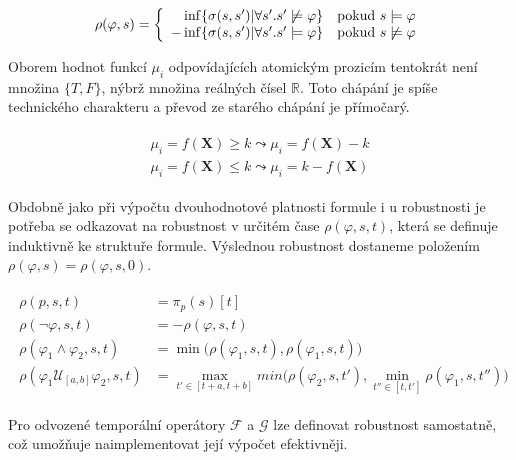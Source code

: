 \begin{align}\label{eq:signal:distance}
\rho(\varphi, s) = \left\{\begin{array}{r@{\quad}c}
\inf\{\sigma(s, s') | \forall s'. s' \not\models \varphi \}	& \textrm{pokud } s \models \varphi	\\
- \inf\{\sigma(s, s') | \forall s'. s' \models \varphi \}	& \textrm{pokud } s \not\models \varphi
\end{array} \right.
\end{align}

Oborem hodnot funkcí $\mu_i$ odpovídajících atomickým prozicím tentokrát není množina $\{T, F\}$,
nýbrž množina reálných čísel $\mathbb{R}$. Toto chápání je spíše technického charakteru a převod
ze starého chápání je přímočarý.

\begin{align}\label{eq:stl:semantics}
\begin{array}{ll}
\mu_i = f(\mathbf{X}) \geq k		\leadsto \mu_i = f(\mathbf{X}) - k							\\
\mu_i = f(\mathbf{X}) \leq k		\leadsto \mu_i = k - f(\mathbf{X})
\end{array}
\end{align}

Obdobně jako při výpočtu dvouhodnotové platnosti formule i u robustnosti je potřeba se odkazovat
na robustnost v určitém čase $\rho(\varphi, s, t)$, která se definuje induktivně ke struktuře
formule. Výslednou robustnost dostaneme položením $\rho(\varphi, s) = \rho(\varphi, s, 0)$.

\begin{align}\label{eq:stl:semantics}
\begin{array}{ll}
\rho(p, s, t)											&= \pi_p(s)[t]											\\
\rho(\neg\varphi, s, t)									&= - \rho(\varphi, s, t)								\\
\rho(\varphi_1 \wedge \varphi_2, s, t)					&= \min\Big(\rho(\varphi_1, s, t), \rho(\varphi_1, s, t)\Big)	\\
\rho(\varphi_1 \mathcal{U}_{[a, b]} \varphi_2, s, t)	&= {\displaystyle \max_{t' \in [t + a, t + b]}} min\Big(\rho(\varphi_2, s, t'), {\displaystyle\min_{t'' \in [t, t']}}\rho(\varphi_1, s, t'')\Big)
\end{array}
\end{align}

Pro odvozené temporální operátory $\mathcal{F}$ a $\mathcal{G}$ lze definovat robustnost
samostatně, což umožňuje naimplementovat její výpočet efektivněji.


